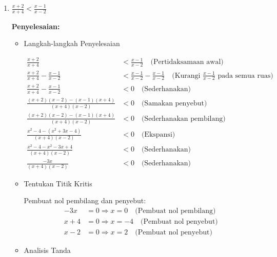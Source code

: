\documentclass{article}
\begin{document}
\begin{enumerate}
\begin{itemize}
\begin{center}
\begin{tikzpicture}[scale=0.8]
    \end{tikzpicture}
    \end{center}
    
    \item HP: $(-\infty, -1) \cup \left(\frac{1}{3}, 3\right)$
    \end{itemize}
    
    \item $\displaystyle \frac{x+2}{x+4} < \frac{x-1}{x-2}$
    
    \textbf{Penyelesaian:}
    
    \begin{itemize}
    \item Langkah-langkah Penyelesaian
    
    \begin{align}
    \frac{x+2}{x+4} &< \frac{x-1}{x-2} \quad \text{(Pertidaksamaan awal)} \\
    \frac{x+2}{x+4} - \frac{x-1}{x-2} &< \frac{x-1}{x-2} - \frac{x-1}{x-2} \quad \text{(Kurangi $\frac{x-1}{x-2}$ pada semua ruas)} \\
    \frac{x+2}{x+4} - \frac{x-1}{x-2} &< 0 \quad \text{(Sederhanakan)} \\
    \frac{(x+2)(x-2) - (x-1)(x+4)}{(x+4)(x-2)} &< 0 \quad \text{(Samakan penyebut)} \\
    \frac{(x+2)(x-2) - (x-1)(x+4)}{(x+4)(x-2)} &< 0 \quad \text{(Sederhanakan pembilang)} \\
    \frac{x^2-4-(x^2+3x-4)}{(x+4)(x-2)} &< 0 \quad \text{(Ekspansi)} \\
    \frac{x^2-4-x^2-3x+4}{(x+4)(x-2)} &< 0 \quad \text{(Sederhanakan)} \\
    \frac{-3x}{(x+4)(x-2)} &< 0 \quad \text{(Sederhanakan)}
    \end{align}
    
    \item Tentukan Titik Kritis
    
    Pembuat nol pembilang dan penyebut:
    \begin{align}
    -3x &= 0 \Rightarrow x = 0 \quad \text{(Pembuat nol pembilang)} \\
    x+4 &= 0 \Rightarrow x = -4 \quad \text{(Pembuat nol penyebut)} \\
    x-2 &= 0 \Rightarrow x = 2 \quad \text{(Pembuat nol penyebut)}
    \end{align}
    
    \item Analisis Tanda
    

\end{itemize}
\end{enumerate}
\end{document}
